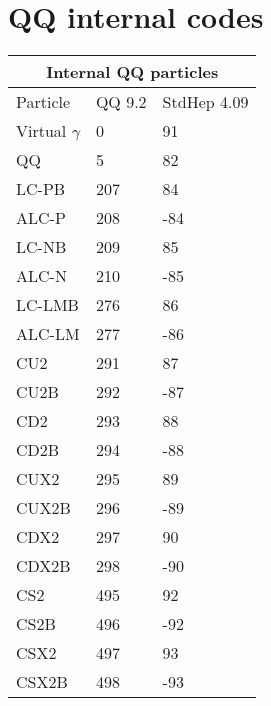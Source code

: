 
\section { QQ internal codes}
\vspace{0.2in}

\begin{tabular}{|l|l|l|} \hline
\multicolumn{3}{|c|}{Internal QQ particles} \\ \hline
Particle &   QQ 9.2 & StdHep 4.09 \\ \hline
Virtual $\gamma$ &   0 &  91 \\ \hline
QQ &   5 &  82 \\ \hline
LC-PB & 207 & 84 \\ \hline
ALC-P & 208 & -84 \\ \hline
LC-NB & 209 & 85 \\ \hline
ALC-N & 210 & -85 \\ \hline
LC-LMB & 276 & 86 \\ \hline
ALC-LM & 277 & -86 \\ \hline
CU2 & 291 & 87 \\ \hline
CU2B & 292 & -87 \\ \hline
CD2 & 293 & 88 \\ \hline
CD2B & 294 & -88 \\ \hline
CUX2 & 295 & 89 \\ \hline
CUX2B & 296 & -89 \\ \hline
CDX2 & 297 & 90 \\ \hline
CDX2B & 298 & -90 \\ \hline
CS2 & 495 & 92 \\ \hline
CS2B & 496 & -92 \\ \hline
CSX2 & 497 & 93 \\ \hline
CSX2B & 498 & -93 \\ \hline
\end{tabular}

\vfill\eject

